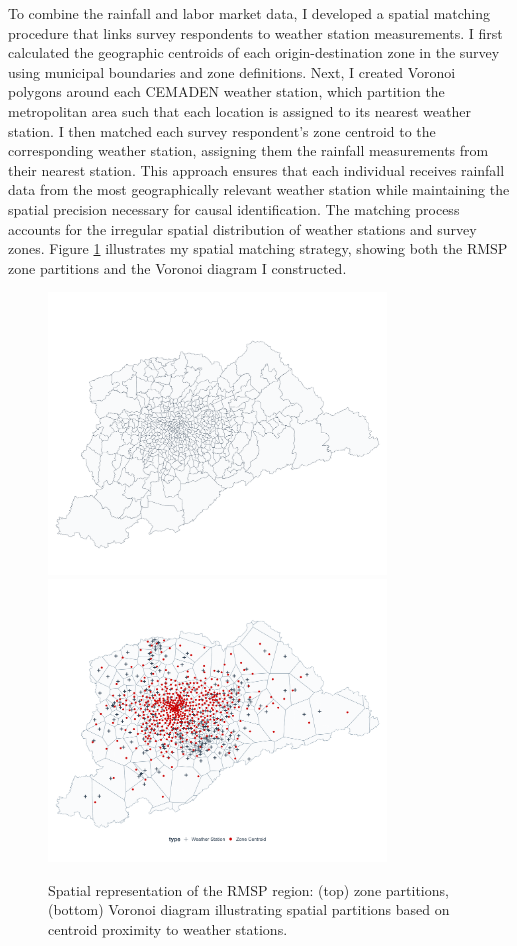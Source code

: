 To combine the rainfall and labor market data, I developed a spatial matching procedure that links survey respondents to weather station measurements. I first calculated the geographic centroids of each origin-destination zone in the survey using municipal boundaries and zone definitions. Next, I created Voronoi polygons around each CEMADEN weather station, which partition the metropolitan area such that each location is assigned to its nearest weather station. I then matched each survey respondent's zone centroid to the corresponding weather station, assigning them the rainfall measurements from their nearest station. This approach ensures that each individual receives rainfall data from the most geographically relevant weather station while maintaining the spatial precision necessary for causal identification. The matching process accounts for the irregular spatial distribution of weather stations and survey zones. Figure \ref{fig:rmsp_voronoi} illustrates my spatial matching strategy, showing both the RMSP zone partitions and the Voronoi diagram I constructed.

\begin{figure}
    \centering
    \includegraphics[width=0.8\textwidth]{../figures/rmsp_base.png}
    \includegraphics[width=0.8\textwidth]{../figures/rmsp_voronoi.png}
    \caption{Spatial representation of the RMSP region: (top) zone partitions, (bottom) Voronoi diagram illustrating spatial partitions based on centroid proximity to weather stations.}
    \label{fig:rmsp_voronoi}
\end{figure}

